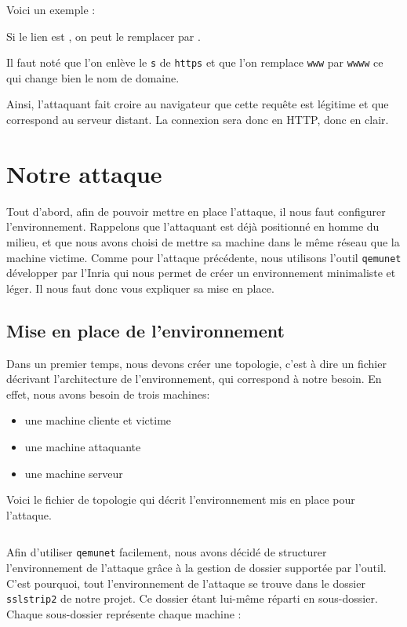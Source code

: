Voici un exemple :

Si le lien est  , on peut le remplacer par .

Il faut noté que l'on enlève le \verb+s+ de \verb+https+ et que l'on remplace \verb+www+ par \verb+wwww+ ce qui change bien le nom de domaine.

Ainsi, l'attaquant fait croire au navigateur que cette requête est légitime et que  correspond au serveur distant. La connexion sera donc en HTTP, donc en clair.

\section{Notre attaque}

Tout d'abord, afin de pouvoir mettre en place l'attaque, il nous faut configurer l'environnement. Rappelons que l'attaquant est déjà positionné en homme du milieu, et que nous avons choisi de mettre sa machine dans le même réseau que la machine victime. Comme pour l'attaque précédente, nous utilisons l'outil \verb+qemunet+ développer par l'Inria qui nous permet de créer un environnement minimaliste et léger. Il nous faut donc vous expliquer sa mise en place.

\subsection{Mise en place de l'environnement}

Dans un premier temps, nous devons créer une topologie, c'est à dire un fichier décrivant l'architecture de l'environnement, qui correspond à notre besoin. En effet, nous avons besoin de trois machines:

\begin{itemize}
\item une machine cliente et victime
\item une machine attaquante
\item une machine serveur
\end{itemize}

Voici le fichier de topologie qui décrit l'environnement mis en place pour l'attaque.

\inputminted[bgcolor=lbcolor, breaklines]{shell}{../sslstrip2/topology}

Afin d'utiliser \verb+qemunet+ facilement, nous avons décidé de structurer l'environnement de l'attaque grâce à la gestion de dossier supportée par l'outil. C'est pourquoi, tout l'environnement de l'attaque se trouve dans le dossier \verb+sslstrip2+ de notre projet. Ce dossier étant lui-même réparti en sous-dossier. Chaque sous-dossier représente chaque machine :

